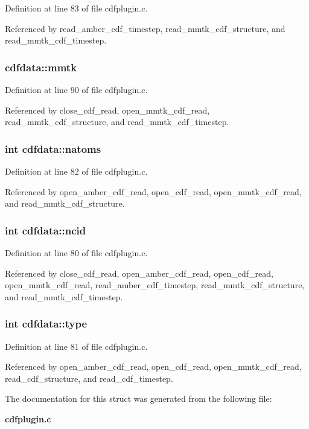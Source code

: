 Definition at line 83 of file cdfplugin.c.

Referenced by read\_\-amber\_\-cdf\_\-timestep, read\_\-mmtk\_\-cdf\_\-structure, and read\_\-mmtk\_\-cdf\_\-timestep.
\subsubsection{ cdfdata::mmtk}\label{structcdfdata_m6}




Definition at line 90 of file cdfplugin.c.

Referenced by close\_\-cdf\_\-read, open\_\-mmtk\_\-cdf\_\-read, read\_\-mmtk\_\-cdf\_\-structure, and read\_\-mmtk\_\-cdf\_\-timestep.
\subsubsection{\setlength{\rightskip}{0pt plus 5cm}int cdfdata::natoms}\label{structcdfdata_m2}




Definition at line 82 of file cdfplugin.c.

Referenced by open\_\-amber\_\-cdf\_\-read, open\_\-cdf\_\-read, open\_\-mmtk\_\-cdf\_\-read, and read\_\-mmtk\_\-cdf\_\-structure.
\subsubsection{\setlength{\rightskip}{0pt plus 5cm}int cdfdata::ncid}\label{structcdfdata_m0}




Definition at line 80 of file cdfplugin.c.

Referenced by close\_\-cdf\_\-read, open\_\-amber\_\-cdf\_\-read, open\_\-cdf\_\-read, open\_\-mmtk\_\-cdf\_\-read, read\_\-amber\_\-cdf\_\-timestep, read\_\-mmtk\_\-cdf\_\-structure, and read\_\-mmtk\_\-cdf\_\-timestep.
\subsubsection{\setlength{\rightskip}{0pt plus 5cm}int cdfdata::type}\label{structcdfdata_m1}




Definition at line 81 of file cdfplugin.c.

Referenced by open\_\-amber\_\-cdf\_\-read, open\_\-cdf\_\-read, open\_\-mmtk\_\-cdf\_\-read, read\_\-cdf\_\-structure, and read\_\-cdf\_\-timestep.

The documentation for this struct was generated from the following file:\begin{CompactItemize}
\item 
{\bf cdfplugin.c}\end{CompactItemize}
